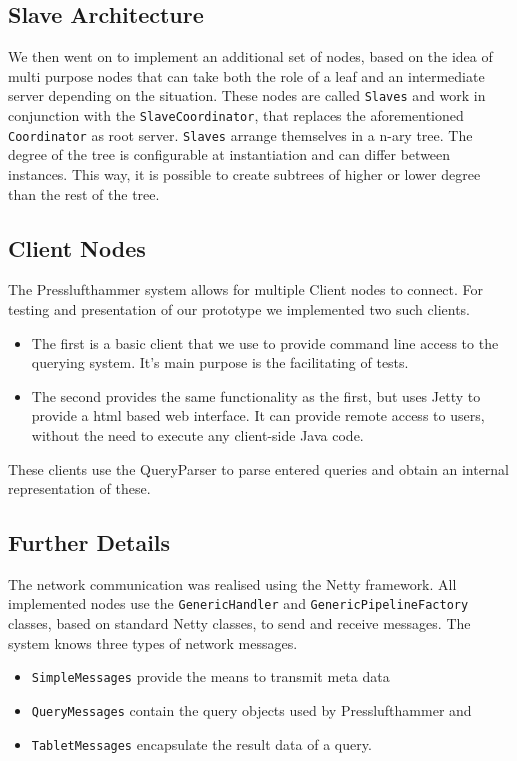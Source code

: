     
  \subsection{Slave Architecture}
    We then went on to implement an additional set of nodes, based on the
    idea of multi purpose nodes that can take both the role of a leaf
    and an intermediate server depending on the situation.
    These nodes are called \texttt{Slaves} and work in conjunction with the
    \texttt{SlaveCoordinator}, that replaces the aforementioned 
    \texttt{Coordinator} as root server.
    \texttt{Slaves} arrange themselves in a n-ary tree.
    The degree of the tree is configurable at instantiation
    and can differ between instances.
    This way, it is possible to create subtrees of higher or lower degree
    than the rest of the tree.


  \subsection{Client Nodes}
    The Presslufthammer system allows for multiple Client nodes to connect.
    For testing and presentation of our prototype we implemented two such
    clients.
    \begin{itemize}
      \item The first is a basic client that we use to provide command
            line access to the querying system.
            It's main purpose is the facilitating of tests.
      \item The second provides the same functionality as the first,
            but uses Jetty \cite{jetty} to provide a html based web
            interface.
            It can provide remote access to users, without the need
            to execute any client-side Java code.
    \end{itemize}
    These clients use the QueryParser to parse entered queries and obtain
    an internal representation of these.


  \subsection{Further Details}
    The network communication was realised using the Netty framework.
    All implemented nodes use the \texttt{GenericHandler} and
    \texttt{GenericPipelineFactory} classes, based on standard Netty classes,
    to send and receive messages.
    The system knows three types of network messages.
    \begin{itemize}
      \item \texttt{SimpleMessages} provide the means to transmit meta data
      \item \texttt{QueryMessages} contain the query objects used by
        Presslufthammer and
      \item \texttt{TabletMessages} encapsulate the result data of a query.
    \end{itemize}


